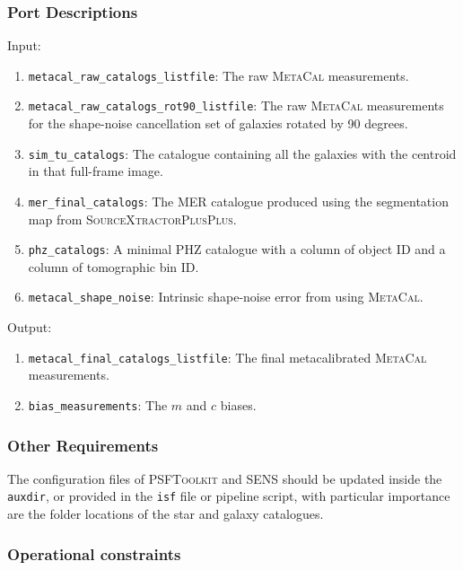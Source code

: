 \documentclass[11pt]{EuclidVIS}
\numberwithin{table}{section}
\numberwithin{figure}{section}
\begin{document}
\subsubsection{Port Descriptions}
Input:

\begin{enumerate}
    \item \texttt{metacal\_raw\_catalogs\_listfile}: The raw \textsc{MetaCal} measurements.
    \item \texttt{metacal\_raw\_catalogs\_rot90\_listfile}: The raw \textsc{MetaCal} measurements for the shape-noise cancellation set of galaxies rotated by 90 degrees.
    \item \texttt{sim\_tu\_catalogs}: The catalogue containing all the galaxies with the centroid in that full-frame image.
    \item \texttt{mer\_final\_catalogs}: The MER catalogue produced using the segmentation map from \textsc{SourceXtractorPlusPlus}.
    \item \texttt{phz\_catalogs}: A minimal PHZ catalogue with a column of object ID and a column of tomographic bin ID.
    \item \texttt{metacal\_shape\_noise}: Intrinsic shape-noise error from using \textsc{MetaCal}.
\end{enumerate}

\noindent Output:

\begin{enumerate}
    \item \texttt{metacal\_final\_catalogs\_listfile}: The final metacalibrated \textsc{MetaCal} measurements.
    \item \texttt{bias\_measurements}: The $m$ and $c$ biases.
\end{enumerate}

\subsubsection{Other Requirements}

The configuration files of \textsc{PSFToolkit} and \textsc{SENS} should be updated inside the \texttt{auxdir}, or provided in the \texttt{isf} file or pipeline script, with particular importance are the folder locations of the star and galaxy catalogues.

\subsubsection{Operational constraints}
\end{document}
